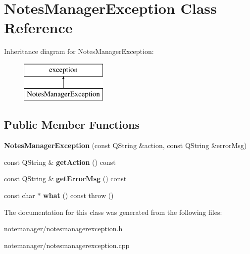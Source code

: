 \hypertarget{class_notes_manager_exception}{\section{Notes\-Manager\-Exception Class Reference}
\label{class_notes_manager_exception}
}
Inheritance diagram for Notes\-Manager\-Exception\-:\begin{figure}[H]
\begin{center}
\leavevmode
\includegraphics[height=2.000000cm]{class_notes_manager_exception}
\end{center}
\end{figure}
\subsection*{Public Member Functions}
\begin{DoxyCompactItemize}
\item 
\hypertarget{class_notes_manager_exception_a5bf3076247a689585ef4ab4cf06c3e66}{{\bfseries Notes\-Manager\-Exception} (const Q\-String \&action, const Q\-String \&error\-Msg)}\label{class_notes_manager_exception_a5bf3076247a689585ef4ab4cf06c3e66}

\item 
\hypertarget{class_notes_manager_exception_a0d9086c80622e597bdeada5193dd4b6a}{const Q\-String \& {\bfseries get\-Action} () const }\label{class_notes_manager_exception_a0d9086c80622e597bdeada5193dd4b6a}

\item 
\hypertarget{class_notes_manager_exception_a0c2dc54b78271e04591674dd6fedbb59}{const Q\-String \& {\bfseries get\-Error\-Msg} () const }\label{class_notes_manager_exception_a0c2dc54b78271e04591674dd6fedbb59}

\item 
\hypertarget{class_notes_manager_exception_a74995ab99a15981ba6bd7e63de0fc4df}{const char $\ast$ {\bfseries what} () const   throw ()}\label{class_notes_manager_exception_a74995ab99a15981ba6bd7e63de0fc4df}

\end{DoxyCompactItemize}


The documentation for this class was generated from the following files\-:\begin{DoxyCompactItemize}
\item 
notemanager/notesmanagerexception.\-h\item 
notemanager/notesmanagerexception.\-cpp\end{DoxyCompactItemize}
